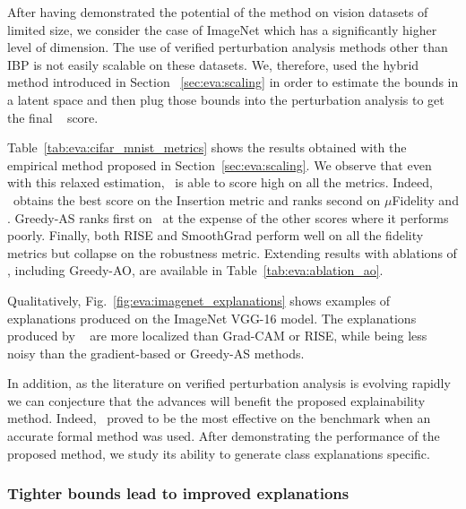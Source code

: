 After having demonstrated the potential of the method on vision datasets of limited size, we consider the case of ImageNet which has a significantly higher level of dimension.
The use of verified perturbation analysis methods other than IBP is not easily scalable on these datasets. We, therefore, used the hybrid method introduced in Section ~\ref{sec:eva:scaling} in order to estimate the bounds in a latent space  and then plug those bounds into the perturbation analysis to get the final \adv~ score.

Table~\ref{tab:eva:cifar_mnist_metrics} shows the results obtained with the empirical method proposed in Section~\ref{sec:eva:scaling}. We observe that even with this relaxed estimation, \eva~is able to score high on all the metrics. Indeed, \eva~obtains the best score on the Insertion metric and ranks second on $\mu$Fidelity and 
\rsr.
Greedy-AS ranks first on \rsr~at the expense of the other scores where it performs poorly. Finally, both RISE and SmoothGrad perform  well on all the fidelity metrics but collapse on the robustness metric. Extending results with ablations of \eva, including Greedy-AO, are available in Table~\ref{tab:eva:ablation_ao}.

Qualitatively, Fig.~\ref{fig:eva:imagenet_explanations} shows examples of explanations produced on the ImageNet VGG-16 model. The explanations produced by \eva~ are more localized than Grad-CAM or RISE, while being less noisy than the gradient-based or Greedy-AS methods.

In addition, as the literature on verified perturbation analysis is evolving rapidly we can conjecture that the advances will benefit the proposed explainability method.
Indeed, \eva~proved to be the most effective on the benchmark when an accurate formal method was used.
After demonstrating the performance of the proposed method, we study its ability to generate class explanations specific. 

\subsubsection{Tighter bounds lead to improved explanations}




